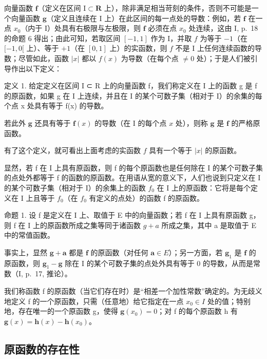 向量函数 \(\mathbf{f}\)（定义在区间 \(\mathrm{I} \subset \mathbf{R}\) 上），除非满足相当苛刻的条件，否则不可能是一个向量函数 \(\mathbf{g}\)（定义且连续在 \(\mathrm{I}\) 上）在此区间的每一点处的导数：例如，若 \(\mathbf{f}\) 在一点 \(x_0\)（内于 \(\mathrm{I}\)）处具有右极限与左极限，则 \(\mathbf{f}\) 必须在点 \(x_0\) 处连续，这由 \(\mathrm{I}\), p.~18 的命题 6 得出；由此可知，若取区间 \([-1, 1]\) 作为 \(\mathrm{I}\)，并取 \(f\) 为等于 \(-1\)（在 \([-1, 0[\) 上）、等于 \(+1\)（在 \([0, 1]\) 上）的实函数，则 \(f\) 不是 \(\mathrm{I}\) 上任何连续函数的导数；尽管如此，函数 \(|x|\) 都以 \(f(x)\) 为导数（在每个点 \(\neq 0\) 处）；于是人们被引导作出以下定义：

定义 1. 给定定义在区间 I ⊂ R 上的向量函数 f，我们称定义在 I 上的函数 g 是 f 的原函数，如果 g 在 I 上连续，并且在 I 的某个可数子集（相对于 I）的余集的每个点 x 处具有等于 f(x) 的导数。

若此外 \(\mathbf{g}\) 还具有等于 \(\mathbf{f}(x)\) 的导数（在 I 的每个点 \(x\) 处），则称 \(\mathbf{g}\) 是 \(\mathbf{f}\) 的严格原函数。

有了这个定义，就可看出上面考虑的实函数 \(f\) 具有一个等于 \(|x|\) 的原函数。

显然，若 f 在 I 上具有原函数，则 f 的每个原函数也是任何除在 I 的某个可数子集的点处外都等于 f 的函数的原函数。在用语从宽的意义下，人们也说到只定义在 I 的某个可数子集（相对于 I）的余集上的函数 \(f_{0}\) 在 I 上的原函数：它将是每个定义在 I 上且等于 \(f_{0}\)（在 \(f_{0}\) 有定义的点处）的函数 f 的原函数。

命题 1. 设 f 是定义在 I 上、取值于 E 中的向量函数；若 f 在 I 上具有原函数 g，则 f 在 I 上的原函数所成之集等同于诸函数 \(g + a\) 所成之集，其中 a 是取值于 E 中的常值函数。

事实上，显然 \(\mathbf{g} + \mathbf{a}\) 都是 \(\mathbf{f}\) 的原函数（对任何 \(\mathbf{a} \in E\)）；另一方面，若 \(\mathbf{g}_1\) 是 \(\mathbf{f}\) 的原函数，则 \(\mathbf{g}_1 - \mathbf{g}\) 除在 I 的某个可数子集的点处外具有等于 0 的导数，从而是常数（I, p.~17, 推论）。

我们称函数 f 的原函数（当它们存在时）是“相差一个加性常数”确定的。为无歧义地定义 f 的一个原函数，只需（任意地）给它指定在一点 \(x_{0} \in I\) 处的值；特别地，存在唯一的一个原函数 g，使得 \(\mathbf{g}(x_{0}) = 0\)；对 f 的每个原函数 h 有 \(\mathbf{g}(x) = \mathbf{h}(x) - \mathbf{h}(x_{0})\)。

\subsection{原函数的存在性}

